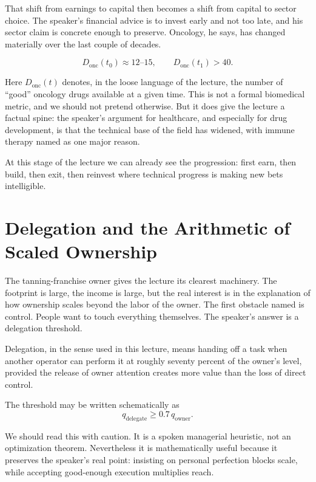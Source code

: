 That shift from earnings to capital then becomes a shift from capital to sector choice. The speaker's financial advice is to invest early and not too late, and his sector claim is concrete enough to preserve. Oncology, he says, has changed materially over the last couple of decades.

\begin{equation}
D_{\mathrm{onc}}(t_0) \approx 12\text{--}15,
\qquad
D_{\mathrm{onc}}(t_1) > 40.
\end{equation}

Here \(D_{\mathrm{onc}}(t)\) denotes, in the loose language of the lecture, the number of ``good'' oncology drugs available at a given time. This is not a formal biomedical metric, and we should not pretend otherwise. But it does give the lecture a factual spine: the speaker's argument for healthcare, and especially for drug development, is that the technical base of the field has widened, with immune therapy named as one major reason.

At this stage of the lecture we can already see the progression: first earn, then build, then exit, then reinvest where technical progress is making new bets intelligible.

\section{Delegation and the Arithmetic of Scaled Ownership}

The tanning-franchise owner gives the lecture its clearest machinery. The footprint is large, the income is large, but the real interest is in the explanation of how ownership scales beyond the labor of the owner. The first obstacle named is control. People want to touch everything themselves. The speaker's answer is a delegation threshold.

\begin{definition}
Delegation, in the sense used in this lecture, means handing off a task when another operator can perform it at roughly seventy percent of the owner's level, provided the release of owner attention creates more value than the loss of direct control.
\end{definition}

The threshold may be written schematically as
\begin{equation}
q_{\mathrm{delegate}} \ge 0.7\,q_{\mathrm{owner}}.
\end{equation}

We should read this with caution. It is a spoken managerial heuristic, not an optimization theorem. Nevertheless it is mathematically useful because it preserves the speaker's real point: insisting on personal perfection blocks scale, while accepting good-enough execution multiplies reach.

